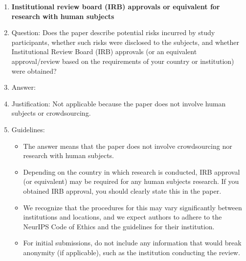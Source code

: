 \documentclass{article}
\theoremstyle{plain}
\theoremstyle{definition}
\theoremstyle{remark}
\begin{document}
\begin{enumerate}
\item {\bf Institutional review board (IRB) approvals or equivalent for research with human subjects}
    \item[] Question: Does the paper describe potential risks incurred by study participants, whether such risks were disclosed to the subjects, and whether Institutional Review Board (IRB) approvals (or an equivalent approval/review based on the requirements of your country or institution) were obtained?
    \item[] Answer: \answerNA{}
    \item[] Justification: Not applicable because the paper does not involve human subjects or crowdsourcing.
    \item[] Guidelines:
    \begin{itemize}
        \item The answer \answerNA{} means that the paper does not involve crowdsourcing nor research with human subjects.
        \item Depending on the country in which research is conducted, IRB approval (or equivalent) may be required for any human subjects research. If you obtained IRB approval, you should clearly state this in the paper.
        \item We recognize that the procedures for this may vary significantly between institutions and locations, and we expect authors to adhere to the NeurIPS Code of Ethics and the guidelines for their institution.
        \item For initial submissions, do not include any information that would break anonymity (if applicable), such as the institution conducting the review.
    \end{itemize}


\end{enumerate}
\end{document}
